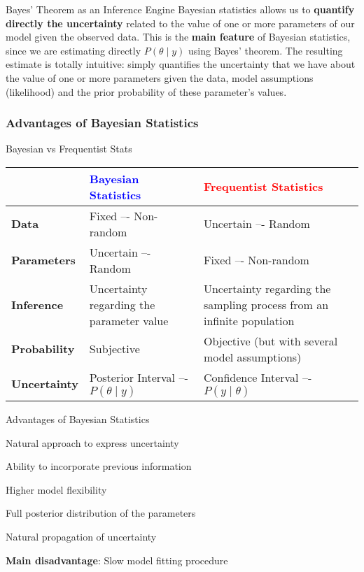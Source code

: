 \begin{frame}{Bayes' Theorem as an Inference Engine}
	Bayesian statistics allows us to \textbf{quantify directly the uncertainty}
	related to the value of one or more parameters of our model given the
	observed data.
	This is the \textbf{main feature} of Bayesian statistics,
	since we are estimating directly $P(\theta \mid y)$ using Bayes' theorem.
	The resulting estimate is totally intuitive:
	simply quantifies the uncertainty that we have about the value of one or more
	parameters given the data, model assumptions (likelihood) and the prior
	probability of these parameter's values.
\end{frame}

\subsubsection{Advantages of Bayesian Statistics}
\begin{frame}{Bayesian vs Frequentist Stats}
	\small
	\begin{tabular}{|l|p{}|p{}|}
		\toprule
		                     & \textcolor{blue}{\textbf{Bayesian Statistics}} & \textcolor{red}{\textbf{Frequentist Statistics}}                       \\ \midrule
		\textbf{Data}        & Fixed –- Non-random                            & Uncertain –- Random                                                    \\ \midrule
		\textbf{Parameters}  & Uncertain –- Random                            & Fixed –- Non-random                                                    \\ \midrule
		\textbf{Inference}   & Uncertainty regarding the parameter value      & Uncertainty regarding the sampling process from an infinite population \\ \midrule
		\textbf{Probability} & Subjective                                     & Objective (but with several model assumptions)                         \\ \midrule
		\textbf{Uncertainty} & Posterior Interval –- $P(\theta \mid y)$       & Confidence Interval –- $P(y \mid \theta)$                              \\
		\bottomrule
	\end{tabular}
\end{frame}

\begin{frame}{Advantages of Bayesian Statistics}
	\begin{vfilleditems}
		\item Natural approach to express uncertainty
		\item Ability to incorporate previous information
		\item Higher model flexibility
		\item Full posterior distribution of the parameters
		\item Natural propagation of uncertainty
	\end{vfilleditems}
	\small \textbf{Main disadvantage}: Slow model fitting procedure
\end{frame}

